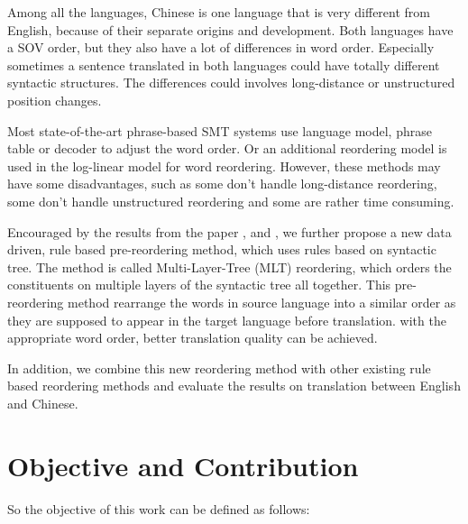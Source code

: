 Among all the languages, Chinese is one language that is very different from English, because of their separate origins and development. Both languages have a SOV order, but they also have a lot of differences in word order. Especially sometimes a sentence translated in both languages could have totally different syntactic structures. The differences could involves long-distance or unstructured position changes.

Most state-of-the-art phrase-based SMT systems use language model, phrase table or decoder to adjust the word order. Or an additional reordering model is used in the log-linear model for word reordering. However, these methods may have some disadvantages, such as some don't handle long-distance reordering, some don't handle unstructured reordering and some are rather time consuming.

Encouraged by the results from the paper \cite{short}, \cite{long} and \cite{tree}, we further propose a new data driven, rule based pre-reordering method, which uses rules based on syntactic tree. The method is called Multi-Layer-Tree (MLT) reordering, which orders the constituents on multiple layers of the syntactic tree all together. This pre-reordering method rearrange the words in source language into a similar order as they are supposed to appear in the target language before translation. with the appropriate word order, better translation quality can be achieved.

In addition, we combine this new reordering method with other existing rule based reordering methods and evaluate the results on translation between English and Chinese. %


\section{Objective and Contribution}
\label{ch:Introduction:sec:ObjectiveAndContribution}

So the objective of this work can be defined as follows:

\begin{center}
\end{center}

